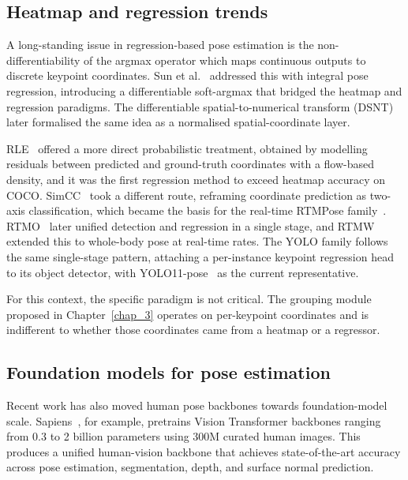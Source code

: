 \subsection{Heatmap and regression trends}
\label{sec_lit_hpe_regression}

A long-standing issue in regression-based pose estimation is the non-differentiability of the argmax operator
which maps continuous outputs to discrete keypoint coordinates.
Sun et al.~\cite{sun2018integral} addressed this with integral pose regression,
introducing a differentiable soft-argmax that bridged the heatmap and regression paradigms.
The differentiable spatial-to-numerical transform (DSNT)~\cite{nibali2018dsnt}
later formalised the same idea as a normalised spatial-coordinate layer.

RLE~\cite{li2021rle} offered a more direct probabilistic treatment,
obtained by modelling residuals between predicted and ground-truth coordinates with a flow-based density,
and it was the first regression method to exceed heatmap accuracy on COCO.
SimCC~\cite{li2022simcc} took a different route,
reframing coordinate prediction as two-axis classification,
which became the basis for the real-time RTMPose family~\cite{jiang2023rtmpose}.
RTMO~\cite{lu2024rtmo} later unified detection and regression in a single stage,
and RTMW~\cite{jiang2024rtmw} extended this to whole-body pose at real-time rates.
The YOLO family follows the same single-stage pattern,
attaching a per-instance keypoint regression head to its object detector,
with YOLO11-pose~\cite{ultralytics2024yolo11} as the current representative.

For this context, the specific paradigm is not critical.
The grouping module proposed in Chapter~\ref{chap_3} operates on per-keypoint coordinates
and is indifferent to whether those coordinates came from a heatmap or a regressor.

\subsection{Foundation models for pose estimation}
\label{sec_lit_hpe_foundation}

Recent work has also moved human pose backbones towards foundation-model scale.
Sapiens~\cite{khirodkar2024sapiens}, for example,
pretrains Vision Transformer backbones ranging from 0.3 to 2 billion parameters
using 300M curated human images.
This produces a unified human-vision backbone that achieves state-of-the-art accuracy
across pose estimation, segmentation, depth, and surface normal prediction.

